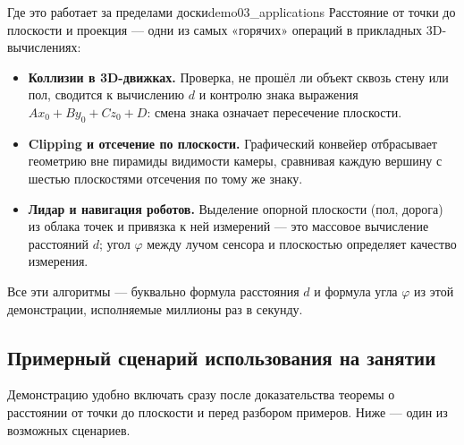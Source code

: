 \begin{remarkIT}{Где это работает за пределами доски}{demo03_applications}
  Расстояние от точки до плоскости и проекция --- одни из самых
  «горячих» операций в прикладных 3D-вычислениях:
  \begin{itemize}
    \item \textbf{Коллизии в 3D-движках.} Проверка, не прошёл ли объект
      сквозь стену или пол, сводится к вычислению $d$ и контролю знака
      выражения $Ax_0+By_0+Cz_0+D$: смена знака означает пересечение
      плоскости.
    \item \textbf{Clipping и отсечение по плоскости.} Графический
      конвейер отбрасывает геометрию вне пирамиды видимости камеры,
      сравнивая каждую вершину с шестью плоскостями отсечения по тому
      же знаку.
    \item \textbf{Лидар и навигация роботов.} Выделение опорной
      плоскости (пол, дорога) из облака точек и привязка к ней
      измерений --- это массовое вычисление расстояний $d$; угол
      $\varphi$ между лучом сенсора и плоскостью определяет качество
      измерения.
  \end{itemize}
  Все эти алгоритмы --- буквально формула расстояния $d$ и формула угла
  $\varphi$ из этой демонстрации, исполняемые миллионы раз в секунду.
\end{remarkIT}

\subsection*{Примерный сценарий использования на занятии}

Демонстрацию удобно включать сразу после доказательства теоремы о
расстоянии от точки до плоскости и перед разбором примеров. Ниже ---
один из возможных сценариев.

